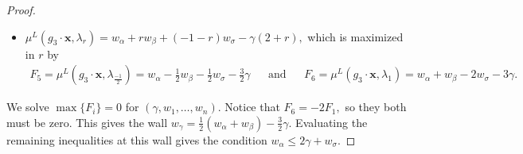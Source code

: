 \documentclass{amsart}
\numberwithin{equation}{section}
\theoremstyle{definition}
\begin{document}
\begin{proof}
\begin{itemize}
    \item$\mu^L(g_3 \cdot \mathbf{x}, \lambda_r) = w_\alpha + r w_\beta + (-1-r)w_\sigma - \gamma(2+r), $
    which is maximized in $r$ by
    \begin{align*}
        F_5 = \mu^L(g_3 \cdot \mathbf{x}, \lambda_{\frac{-1}{2}}) = w_\alpha - \frac{1}{2}w_\beta - \frac{1}{2}w_\sigma - \frac{3}{2}\gamma
        && \text{and} &&
        F_6 = \mu^L(g_3 \cdot \mathbf{x}, \lambda_1) = w_\alpha + w_\beta -2w_\sigma -3\gamma.
    \end{align*}
\end{itemize}
We solve $\max \{F_i\} =0$ for $(\gamma, w_1, \dots , w_n)$. Notice that $F_6 = -2F_1,$ so they both must be zero. This gives the wall $w_\gamma = \frac{1}{2}(w_\alpha + w_\beta) - \frac{3}{2} \gamma.$ Evaluating the remaining inequalities at this wall gives the condition $w_\alpha \leq 2\gamma + w_\sigma.$




 





\end{proof}
\end{document}
